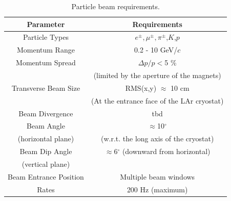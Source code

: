 %

\begin{table}[h]
\centering
\begin{tabular}{|c|c|}
\hline
\textbf{Parameter } & \textbf{Requirements}  \\ \hline
  Particle Types        & $e^\pm,\mu^\pm,\pi^\pm$,$K$,$p$  \\ \hline
  Momentum Range   & 0.2 - 10 GeV/$c$ \\ \hline
  Momentum Spread   & $\Delta p/p  < $5 \% \\
  & (limited by the aperture of the magnets)  \\ \hline
  Transverse Beam Size   & RMS(x,y) $\approx$ 10 cm  \\
  & (At the entrance face of the LAr cryostat) \\ \hline
  Beam Divergence & tbd   \\ \hline
  Beam Angle &  $\approx$10$^{\circ}$ \\
  (horizontal plane) &  (w.r.t. the long axis of the cryostat)\\ \hline
  Beam Dip Angle &  $\approx$6$^\circ$ (downward from horizontal)   \\ 
  (vertical plane) &  \\ \hline
  Beam Entrance Position & Multiple beam windows    \\ \hline
  Rates & 200 Hz (maximum)    \\ \hline
\end{tabular}
\caption{Particle beam requirements.}
\label{table:beamspecs}
\end{table}

